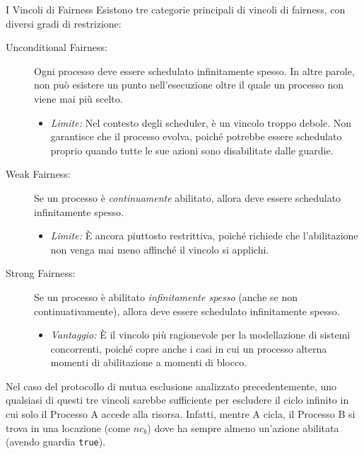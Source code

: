 \begin{definition}{I Vincoli di Fairness}
  Esistono tre categorie principali di vincoli di fairness, con diversi gradi di restrizione:

  \begin{description}
    \item[Unconditional Fairness:] Ogni processo deve essere schedulato infinitamente spesso. In altre parole, non può esistere un punto nell'esecuzione oltre il quale un processo non viene mai più scelto.
      \begin{itemize}
        \item \textit{Limite:} Nel contesto degli scheduler, è un vincolo troppo debole. Non garantisce che il processo evolva, poiché potrebbe essere schedulato proprio quando tutte le sue azioni sono disabilitate dalle guardie.
      \end{itemize}

    \item[Weak Fairness:] Se un processo è \textit{continuamente} abilitato, allora deve essere schedulato infinitamente spesso.
      \begin{itemize}
        \item \textit{Limite:} È ancora piuttosto restrittiva, poiché richiede che l'abilitazione non venga mai meno affinché il vincolo si applichi.
      \end{itemize}

    \item[Strong Fairness:] Se un processo è abilitato \textit{infinitamente spesso} (anche se non continuativamente), allora deve essere schedulato infinitamente spesso.
      \begin{itemize}
        \item \textit{Vantaggio:} È il vincolo più ragionevole per la modellazione di sistemi concorrenti, poiché copre anche i casi in cui un processo alterna momenti di abilitazione a momenti di blocco.
      \end{itemize}
  \end{description}
\end{definition}


Nel caso del protocollo di mutua esclusione analizzato precedentemente, uno qualsiasi di questi tre vincoli sarebbe sufficiente per escludere il ciclo infinito in cui solo il Processo A accede alla risorsa. Infatti, mentre A cicla, il Processo B si trova in una locazione (come \(nc_b\)) dove ha sempre almeno un'azione abilitata (avendo guardia \texttt{true}).

